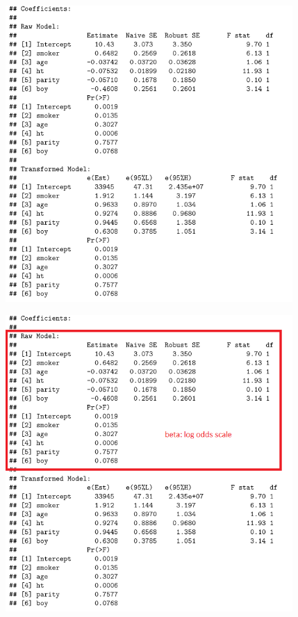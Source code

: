 \documentclass[12pt, 
hyperref={colorlinks=true, linkcolor=blue, urlcolor=cyan}]{beamer}
\begin{document}
\begin{frame}
\vspace{0.1cm}
\includegraphics[width=0.82\textwidth]{./figs/pregnancy_coef}
\end{frame}

\begin{frame}[noframenumbering]
\vspace{0.1cm}
\includegraphics[width=0.82\textwidth]{./figs/pregnancy_coef_raw}
\end{frame}
\end{document}
